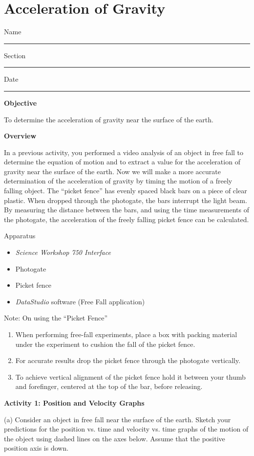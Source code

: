 
\section{Acceleration of Gravity}

Name \rule{2.0in}{0.1pt}\hfill{}Section \rule{1.0in}{0.1pt}\hfill{}Date \rule{1.0in}{0.1pt}

\textbf{Objective} 

To determine the acceleration of gravity near the surface of the earth.

\textbf{Overview }

In a previous activity, you performed a video analysis of an object in free
fall to determine the equation of motion and to extract a value for the acceleration
of gravity near the surface of the earth. Now we will make a more accurate determination
of the acceleration of gravity by timing the motion of a freely falling object.
The ``picket fence'' has evenly spaced black bars on a piece
of clear plastic. When dropped through the photogate, the bars interrupt the
light beam. By measuring the distance between the bars, and using the time measurements
of the photogate, the acceleration of the freely falling picket fence can be
calculated. 

Apparatus 

\begin{itemize}
\item \textit{Science Workshop 750 Interface}
\item Photogate 
\item Picket fence 
\item \textit{DataStudio} software (Free Fall application)
\end{itemize}
Note: On using the ``Picket Fence''

\begin{enumerate}
\item When performing free-fall experiments, place a box with packing material under
the experiment to cushion the fall of the picket fence.
\item For accurate results drop the picket fence through the photogate vertically.
\item To achieve vertical alignment of the picket fence hold it between your thumb
and forefinger, centered at the top of the bar, before releasing.
\end{enumerate}
\textbf{Activity 1: Position and Velocity Graphs}

(a) Consider an object in free fall near the surface of the earth. Sketch your
predictions for the position vs. time and velocity vs. time graphs of the motion
of the object using dashed lines on the axes below. Assume that the positive
position axis is down.

